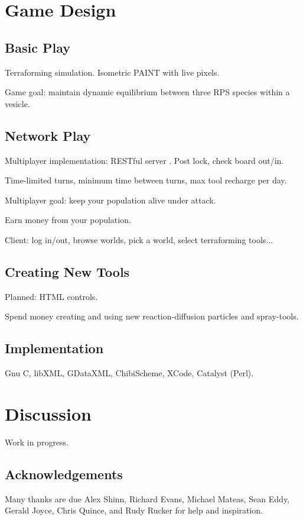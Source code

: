 \documentclass{acm_proc_article-sp}
\begin{document}
\section{Game Design}

\subsection{Basic Play}

Terraforming simulation.
Isometric PAINT with live pixels.

Game goal: maintain dynamic equilibrium between three RPS species within a vesicle.

\subsection{Network Play}

Multiplayer implementation: RESTful server \cite{rest}.
Post lock, check board out/in.

Time-limited turns, minimum time between turns, max tool recharge per day.

Multiplayer goal: keep your population alive under attack.

Earn money from your population.

Client: log in/out, browse worlds, pick a world, select terraforming tools...

\subsection{Creating New Tools}

Planned: HTML controls.

Spend money creating and using new reaction-diffusion particles and spray-tools.

\subsection{Implementation}

Gnu C, libXML, GDataXML, ChibiScheme, XCode, Catalyst (Perl).

\section{Discussion}

Work in progress.

\subsection{Acknowledgements}

Many thanks are due Alex Shinn, Richard Evans, Michael Mateas, Sean Eddy, Gerald Joyce, Chris Quince,
and Rudy Rucker for help and inspiration.




\balancecolumns
\end{document}
